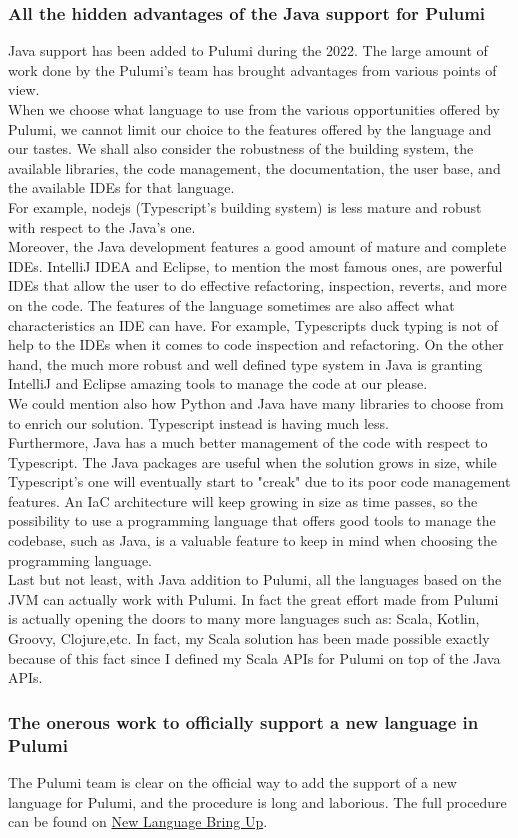 \subsubsection{All the hidden advantages of the Java support for Pulumi}
Java support has been added to Pulumi during the 2022.
The large amount of work done by the Pulumi's team has brought advantages from various points of view.\\
When we choose what language to use from the various opportunities offered by Pulumi, we cannot limit our choice to the features offered by the language and our tastes.
We shall also consider the robustness of the building system, the available libraries, the code management, the documentation, the user base, and the available IDEs for that language.\\
For example, nodejs (Typescript's building system) is less mature and robust with respect to the Java's one.\\
Moreover, the Java development features a good amount of mature and complete IDEs.
IntelliJ IDEA and Eclipse, to mention the most famous ones, are powerful IDEs that allow the user to do effective refactoring, inspection, reverts, and more on the code.
The features of the language sometimes are also affect what characteristics an IDE can have.
For example, Typescripts duck typing is not of help to the IDEs when it comes to code inspection and refactoring.
On the other hand, the much more robust and well defined type system in Java is granting IntelliJ and Eclipse amazing tools to manage the code at our please.\\
We could mention also how Python and Java have many libraries to choose from to enrich our solution.
Typescript instead is having much less.\\
Furthermore, Java has a much better management of the code with respect to Typescript.
The Java packages are useful when the solution grows in size, while Typescript's one will eventually start to "creak" due to its poor code management features.
An IaC architecture will keep growing in size as time passes, so the possibility to use a programming language that offers good tools to manage the codebase, such as Java, is a valuable feature to keep in mind when choosing the programming language.\\
Last but not least, with Java addition to Pulumi, all the languages based on the JVM can actually work with Pulumi.
In fact the great effort made from Pulumi is actually opening the doors to many more languages such as: Scala, Kotlin, Groovy, Clojure,etc.
In fact, my Scala solution has been made possible exactly because of this fact since I defined my Scala APIs for Pulumi on top of the Java APIs.


\subsubsection{The onerous work to officially support a new language in Pulumi}
\label{sssec:off-support-pulumi}
The Pulumi team is clear on the official way to add the support of a new language for Pulumi, and the procedure is long and laborious.
The full procedure can be found on \href{https://github.com/pulumi/pulumi/wiki/New-Language-Bring-up}{New Language Bring Up}.\\
